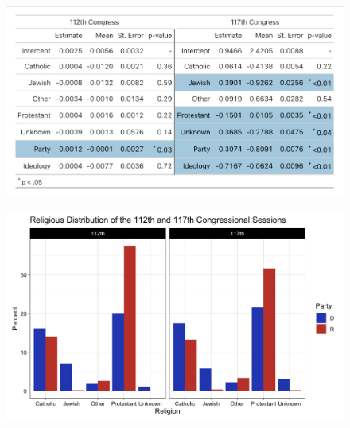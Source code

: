\documentclass[Royal,times,sageh]{sagej}
\begin{document}
\begin{figure}
\includegraphics[width=1\linewidth]{images/final_model3} \caption{\label{fig:plot}}\label{fig:plot-ref}
\end{figure}

\begin{figure}

{\centering \includegraphics[width=0.7\linewidth]{images/percent_graph} 

}

\caption{\label{table5}}\label{fig:table5}
\end{figure}



\end{document}
